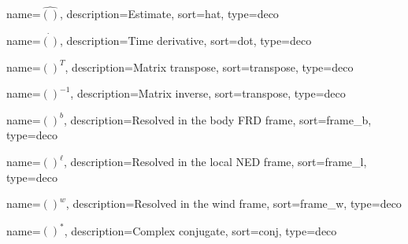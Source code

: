 {
	name={$\hat{()}$},
	description={Estimate},
	sort=hat,
	type=deco
}

{
	name={$\dot{()}$},
	description={Time derivative},
	sort=dot,
	type=deco
}

{
	name={$()^T$},
	description={Matrix transpose},
	sort=transpose,
	type=deco
}

{
	name={$()^{-1}$},
	description={Matrix inverse},
	sort=transpose,
	type=deco
}

{
	name={$()^b$},
	description={Resolved in the body FRD frame},
	sort=frame_b,
	type=deco
}

{
	name={$()^\ell$},
	description={Resolved in the local NED frame},
	sort=frame_l,
	type=deco
}

{
	name={$()^w$},
	description={Resolved in the wind frame},
	sort=frame_w,
	type=deco
}

{
	name={$()^*$},
	description={Complex conjugate},
	sort=conj,
	type=deco
}

